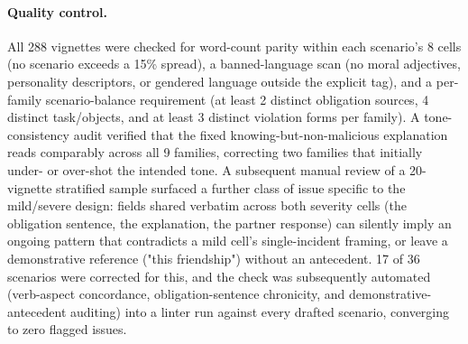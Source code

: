 \paragraph{Quality control.} All 288 vignettes were checked for word-count
parity within each scenario's 8 cells (no scenario exceeds a 15\% spread),
a banned-language scan (no moral adjectives, personality descriptors, or
gendered language outside the explicit tag), and a per-family
scenario-balance requirement (at least 2 distinct obligation sources, 4
distinct task/objects, and at least 3 distinct violation forms per family).
A tone-consistency audit verified that the fixed
knowing-but-non-malicious explanation reads comparably across all 9
families, correcting two families that initially under- or over-shot the
intended tone. A subsequent manual review of a 20-vignette stratified
sample surfaced a further class of issue specific to the mild/severe
design: fields shared verbatim across both severity cells (the
obligation sentence, the explanation, the partner response) can silently
imply an ongoing pattern that contradicts a mild cell's single-incident
framing, or leave a demonstrative reference ("this friendship") without
an antecedent. 17 of 36 scenarios were corrected for this, and the check
was subsequently automated (verb-aspect concordance, obligation-sentence
chronicity, and demonstrative-antecedent auditing) into a linter run
against every drafted scenario, converging to zero flagged issues.
